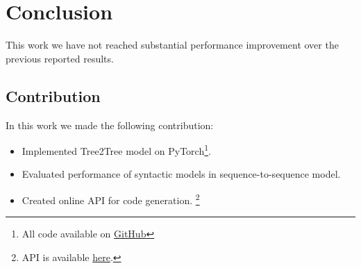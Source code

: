 \chapter{Conclusion} 

\label{Chapter6} 

This work we have not reached substantial performance improvement over the previous reported results. 

\section{Contribution}
In this work we made the following contribution:
\begin{itemize}
    \item Implemented Tree2Tree model on PyTorch\footnote{All code available on \href{https://github.com/tsdaemon/treelstm-code-generation/}{GitHub}}.
	\item Evaluated performance of syntactic models in sequence-to-sequence model.
	\item Created online API for code generation. \footnote{API is available \href{http://daemon-engineer.com/apps/codegen}{here}.}
\end{itemize}

